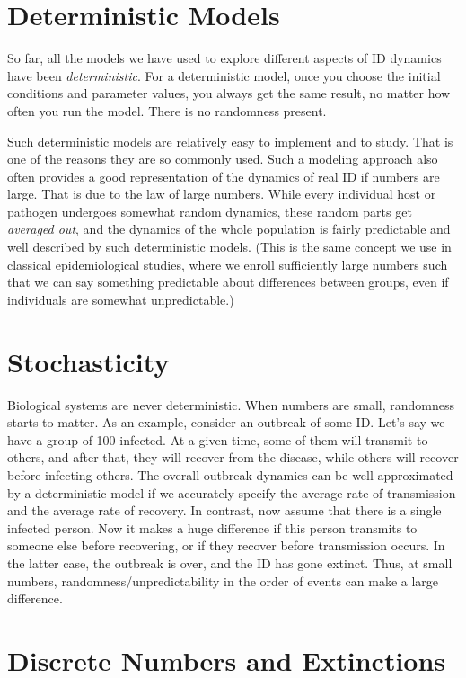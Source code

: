 \documentclass[]{book}
\theoremstyle{definition}
\theoremstyle{definition}
\theoremstyle{definition}
\theoremstyle{remark}
\begin{document}
\section{Deterministic Models}\label{deterministic-models}

So far, all the models we have used to explore different aspects of ID
dynamics have been \emph{deterministic}. For a deterministic model, once
you choose the initial conditions and parameter values, you always get
the same result, no matter how often you run the model. There is no
randomness present.

Such deterministic models are relatively easy to implement and to study.
That is one of the reasons they are so commonly used. Such a modeling
approach also often provides a good representation of the dynamics of
real ID if numbers are large. That is due to the law of large numbers.
While every individual host or pathogen undergoes somewhat random
dynamics, these random parts get \emph{averaged out}, and the dynamics
of the whole population is fairly predictable and well described by such
deterministic models. (This is the same concept we use in classical
epidemiological studies, where we enroll sufficiently large numbers such
that we can say something predictable about differences between groups,
even if individuals are somewhat unpredictable.)

\section{Stochasticity}\label{stochasticity}

Biological systems are never deterministic. When numbers are small,
randomness starts to matter. As an example, consider an outbreak of some
ID. Let's say we have a group of 100 infected. At a given time, some of
them will transmit to others, and after that, they will recover from the
disease, while others will recover before infecting others. The overall
outbreak dynamics can be well approximated by a deterministic model if
we accurately specify the average rate of transmission and the average
rate of recovery. In contrast, now assume that there is a single
infected person. Now it makes a huge difference if this person transmits
to someone else before recovering, or if they recover before
transmission occurs. In the latter case, the outbreak is over, and the
ID has gone extinct. Thus, at small numbers, randomness/unpredictability
in the order of events can make a large difference.

\section{Discrete Numbers and
Extinctions}\label{discrete-numbers-and-extinctions}
\end{document}
